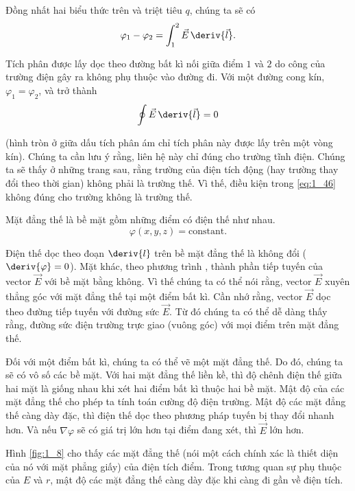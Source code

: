 \noindent
Đồng nhất hai biểu thức trên và triệt tiêu $q$, chúng ta sẽ có
\begin{equation}\label{eq:1_45}
	\varphi_1 - \varphi_2 = \int_1^2 \vec{E}\, \deriv{\vec{l}}.
\end{equation}

\noindent
Tích phân được lấy dọc theo đường bất kì nối giữa điểm $1$ và $2$ do công của trường điện gây ra không phụ thuộc vào đường đi. Với một đường cong kín, $\varphi_1=\varphi_2$, và  trở thành
\begin{equation}\label{eq:1_46}
	\oint \vec{E}\, \deriv{\vec{l}} = 0
\end{equation}

\noindent
(hình tròn ở giữa dấu tích phân ám chỉ tích phân này được lấy trên một vòng kín). Chúng ta cần lưu ý rằng, liên hệ này chỉ đúng cho trường tĩnh điện. Chúng ta sẽ thấy ở những trang sau, rằng trường của điện tích động (hay trường thay đổi theo thời gian) không phải là trường thế. Vì thế, điều kiện trong \eqref{eq:1_46} không đúng cho trường không là trường thế.

Mặt đẳng thế là bề mặt gồm những điểm có điện thế như nhau.
\begin{equation*}
	\varphi(x,y,z) = \text{constant}.
\end{equation*}

\noindent
Điện thế dọc theo đoạn $\deriv{l}$ trên bề mặt đẳng thế là không đổi ($\deriv{\varphi}=0$). Mặt khác, theo phương trình , thành phần tiếp tuyến của vector $\vec{E}$ với bề mặt bằng không. Vì thế chúng ta có thể nói rằng, vector $\vec{E}$ xuyên thẳng góc với mặt đẳng thế tại một điểm bất kì. Cần nhớ rằng, vector $\vec{E}$ dọc theo đường tiếp tuyến với đường sức $\vec{E}$. Từ đó chúng ta có thể dễ dàng thấy rằng, đường sức điện trường trực giao (vuông góc) với mọi điểm trên mặt đẳng thế.

Đối với một điểm bất kì, chúng ta có thể vẽ một mặt đẳng thế. Do đó, chúng ta sẽ có vô số các bề mặt. Với hai mặt đẳng thế liền kề, thì độ chênh điện thế giữa hai mặt là giống nhau khi xét hai điểm bất kì thuộc hai bề mặt. Mật độ của các mặt đẳng thế cho phép ta tính toán cường độ điện trường. Mật độ các mặt đẳng thế càng dày đặc, thì điện thế dọc theo phương pháp tuyến bị thay đổi nhanh hơn. Và nếu $\nabla\varphi$ sẽ có giá trị lớn hơn tại điểm đang xét, thì $\vec{E}$ lớn hơn. 

Hình \ref{fig:1_8} cho thấy các mặt đẳng thế (nói một cách chính xác là thiết diện của nó với mặt phẳng giấy) của điện tích điểm. Trong tương quan sự phụ thuộc của $E$ và $r$, mật độ các mặt đẳng thế càng dày đặc khi càng đi gần về điện tích. 

